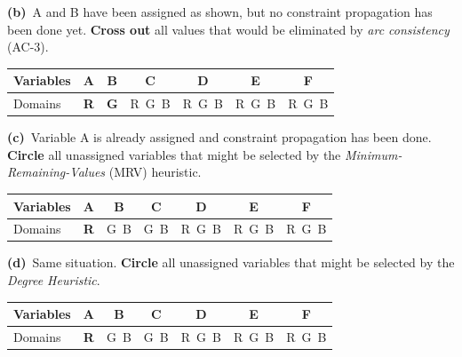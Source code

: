 \documentclass[11pt,a4paper]{article}
\newcommand{\subq}[1]{\par\smallskip\noindent\textbf{#1}\ }
\begin{document}
\subq{(b)}A and B have been assigned as shown, but no constraint propagation has been done yet. \textbf{Cross out} all values that would be eliminated by \emph{arc consistency} (AC-3).\begin{center}\small\begin{tabular}{|l|c|c|c|c|c|c|}\hline Variables & \textbf{A} & \textbf{B} & \textbf{C} & \textbf{D} & \textbf{E} & \textbf{F}\\ \hline Domains & \textbf{R} & \textbf{G} & R\ G\ B & R\ G\ B & R\ G\ B & R\ G\ B\\ \hline\end{tabular}\end{center}

\subq{(c)}Variable A is already assigned and constraint propagation has been done. \textbf{Circle} all unassigned variables that might be selected by the \emph{Minimum-Remaining-Values} (MRV) heuristic.\begin{center}\small\begin{tabular}{|l|c|c|c|c|c|c|}\hline Variables & \textbf{A} & \textbf{B} & \textbf{C} & \textbf{D} & \textbf{E} & \textbf{F}\\ \hline Domains & \textbf{R} & G\ B & G\ B & R\ G\ B & R\ G\ B & R\ G\ B\\ \hline\end{tabular}\end{center}

\subq{(d)}Same situation. \textbf{Circle} all unassigned variables that might be selected by the \emph{Degree Heuristic}.\begin{center}\small\begin{tabular}{|l|c|c|c|c|c|c|}\hline Variables & \textbf{A} & \textbf{B} & \textbf{C} & \textbf{D} & \textbf{E} & \textbf{F}\\ \hline Domains & \textbf{R} & G\ B & G\ B & R\ G\ B & R\ G\ B & R\ G\ B\\ \hline\end{tabular}\end{center}
\end{document}
